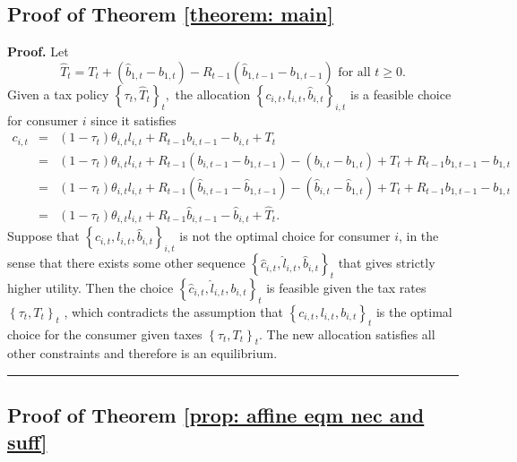 \documentclass[thmsb,11pt]{article}
\newenvironment{proof}[1][Proof]{\noindent \textbf{#1.} }{\  \rule{0.5em}{0.5em}}
\begin{document}
\subsection{Proof of Theorem \ref{theorem: main}}
\label{appndx: thm RE}
 \begin{proof}
 Let
 \begin{equation}
 \hat{T}_{t}=T_{t} + \left(\hat{b}_{1,t} - b_{1,t}\right) -
 R_{t-1}\left(\hat{b}_{1,t-1} - b_{1,t-1}\right) \text{ for
 all }t\geq 0.  \label{construct That}
 \end{equation}%
 Given  a tax policy $\left \{ \tau _{t},\hat{T}_{t}\right \} _{t},$ the
 allocation $\left \{ c_{i,t},l_{i,t},\hat{b}_{i,t}\right \}_{i,t}$ is a feasible choice for consumer $i$ since it satisfies%
 \begin{eqnarray*}
 c_{i,t}&=&\left( 1-\tau _{t}\right) \theta _{i,t}l_{i,t}+R_{t-1}b_{i,t-1}-b_{i,t}+T_{t}\\
 &=&\left( 1-\tau _{t}\right) \theta _{i,t}l_{i,t}+R_{t-1}\left( b_{i,t-1}-b_{1,t-1}\right) -\left(
 b_{i,t}-b_{1,t}\right) +T_{t}+R_{t-1}b_{1,t-1}-b_{1,t} \\
 &=&\left( 1-\tau _{t}\right) \theta _{i,t}l_{i,t}+R_{t-1}\left( \hat{b}_{i,t-1}-\hat{b}_{1,t-1}\right) -\left( \hat{b%
 }_{i,t}-\hat{b}_{1,t}\right) +T_{t}+R_{t-1}b_{1,t-1}-b_{1,t} \\
  &=&\left( 1-\tau _{t}\right) \theta
 _{i,t}l_{i,t}+R_{t-1}\hat{b}_{i,t-1}-\hat{b}_{i,t}+\hat{T}_{t}.
 \end{eqnarray*}%
 Suppose that $\left \{ c_{i,t},l_{i,t},\hat{b}_{i,t}\right \}_{i,t}$ is not the optimal choice for consumer $i$, in the sense that there exists some
 other sequence $\left \{ \hat{c}_{i,t},\hat{l}_{i,t},\hat{b}_{i,t}\right \}_{t}$ that gives strictly higher utility.  Then the choice $%
 \left \{ \hat{c}_{i,t},\hat{l}_{i,t},b_{i,t}\right \}_{t}$ is
 feasible given the tax rates  $\left \{ \tau _{t},T_{t}\right \} _{t}$%
 , which contradicts the assumption that $\left \{ c_{i,t},l_{i,t},b_{i,t}\right \}_{t}$ is the optimal choice for
 the consumer given taxes $\left \{ \tau _{t},T_{t}\right \}
 _{t}$. The new allocation satisfies all other constraints and
 therefore is an equilibrium.
 \end{proof}
\newpage

\subsection{Proof of Theorem \ref{prop: affine eqm nec and suff}}
\label{appndx: affine eqm nec and stuff}
\smallskip
\end{document}
